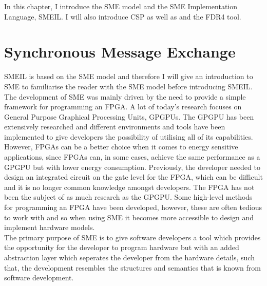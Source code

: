 In this chapter, I introduce the SME model and the SME Implementation Language, SMEIL. I will also introduce CSP as well as \cspm{} and the FDR4 tool.

\section{Synchronous Message Exchange}
SMEIL is based on the SME model and therefore I will give an introduction to SME to familiarise the reader with the SME model before introducing SMEIL.
\\

The development of SME was mainly driven by the need to provide a simple framework for programming an FPGA. A lot of today's research focuses on General Purpose Graphical Processing Units, GPGPUs.%
The GPGPU has been extensively researched and different environments and tools have been implemented to give developers the possibility of utilising all of its capabilities. %
However, FPGAs can be a better choice when it comes to energy sensitive applications, since FPGAs can, in some cases, achieve the same performance as a GPGPU but with lower energy consumption. %
Previously, the developer needed to design an integrated circuit on the gate level for the FPGA, which can be difficult and it is no longer common knowledge amongst developers. The FPGA has not been the subject of as much research as the GPGPU. Some high-level methods for programming an FPGA have been developed, however, these are often tedious to work with and so when using SME it becomes more accessible to design and implement hardware models.\\

The primary purpose of SME is to give software developers a tool which provides the opportunity for the developer to program hardware but with an added abstraction layer which seperates the developer from the hardware details, such that, the development resembles the structures and semantics that is known from software development.

